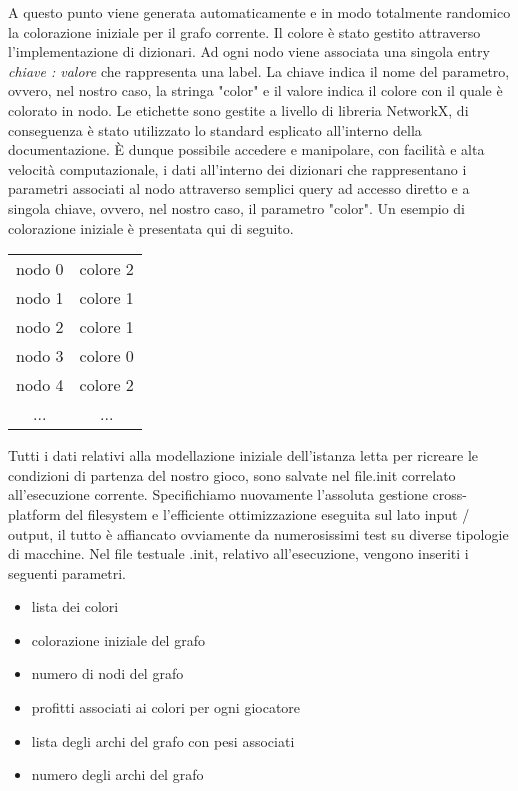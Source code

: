 A questo punto viene generata automaticamente e in modo totalmente randomico la colorazione iniziale per il grafo corrente. Il colore è stato gestito attraverso l'implementazione di dizionari. Ad ogni nodo viene associata una singola entry \textit{chiave : valore} che rappresenta una label. La chiave indica il nome del parametro, ovvero, nel nostro caso, la stringa "color" e il valore indica il colore con il quale è colorato in nodo. Le etichette sono gestite a livello di libreria NetworkX, di conseguenza è stato utilizzato lo standard esplicato all'interno della documentazione. È dunque possibile accedere e manipolare, con facilità e alta velocità computazionale, i dati all'interno dei dizionari che rappresentano i parametri associati al nodo attraverso semplici query ad accesso diretto e a singola chiave, ovvero, nel nostro caso, il parametro "color". Un esempio di colorazione iniziale è presentata qui di seguito.

\begin{table}[H]
\centering
\begin{tabular}{cc}
nodo 0 & colore 2 \\
nodo 1 & colore 1 \\
nodo 2 & colore 1 \\
nodo 3 & colore 0 \\
nodo 4 & colore 2 \\
... & ...
\end{tabular}
\end{table}

Tutti i dati relativi alla modellazione iniziale dell'istanza letta per ricreare le condizioni di partenza del nostro gioco, sono salvate nel file.init correlato all'esecuzione corrente. Specifichiamo nuovamente l'assoluta gestione cross-platform del filesystem e l'efficiente ottimizzazione eseguita sul lato input / output, il tutto è affiancato ovviamente da numerosissimi test su diverse tipologie di macchine. Nel file testuale .init, relativo all'esecuzione, vengono inseriti i seguenti parametri.

\begin{itemize}
	\item lista dei colori
	\item colorazione iniziale del grafo
	\item numero di nodi del grafo
	\item profitti associati ai colori per ogni giocatore
	\item lista degli archi del grafo con pesi associati
	\item numero degli archi del grafo
\end{itemize}

